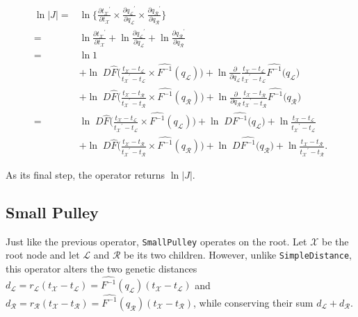 \documentclass[12pt]{article}
\begin{document}
\begin{align}
	\ln |J| =&  \ln \{ \frac{\partial {t_\mathcal{X}}^\prime}{\partial t_\mathcal{X}} \times \frac{\partial {q_\mathcal{L}}^\prime}{\partial q_\mathcal{L}} \times \frac{\partial {q_\mathcal{R}}^\prime}{\partial q_\mathcal{R}} \} \nonumber \\
			=& \ln \frac{\partial {t_\mathcal{X}}^\prime}{\partial t_\mathcal{X}} +  \ln \frac{\partial {q_\mathcal{L}}^\prime}{\partial q_\mathcal{L}} + \ln \frac{\partial {q_\mathcal{R}}^\prime}{\partial q_\mathcal{R}} \nonumber \\
			=& \ln 1  \nonumber\\
			&+ \ln \; D \hat{F}\Big( \frac{t_\mathcal{X} - t_\mathcal{L}}{{t_\mathcal{X}}^\prime - t_\mathcal{L}} \times \hat{F^{-1}}(q_\mathcal{L}) \Big) + \ln \frac{\partial}{\partial q_\mathcal{L}} \frac{t_\mathcal{X} - t_\mathcal{L}}{{t_\mathcal{X}}^\prime - t_\mathcal{L}} \hat{F^{-1}} \Big( q_\mathcal{L} \Big) \nonumber\\
			&+ \ln \; D \hat{F}\Big( \frac{t_\mathcal{X} - t_\mathcal{R}}{{t_\mathcal{X}}^\prime - t_\mathcal{R}}\times \hat{F^{-1}}(q_\mathcal{R}) \Big) + \ln \frac{\partial}{\partial q_\mathcal{R}} \frac{t_\mathcal{X} - t_\mathcal{R}}{{t_\mathcal{X}}^\prime - t_\mathcal{R}} \hat{F^{-1}} \Big( q_\mathcal{R} \Big) \nonumber\\
			=& \ln \; D \hat{F}\Big( \frac{t_\mathcal{X} - t_\mathcal{L}}{{t_\mathcal{X}}^\prime - t_\mathcal{L}} \times \hat{F^{-1}}(q_\mathcal{L}) \Big) + \ln \; D \hat{F^{-1}} \Big( q_\mathcal{L} \Big) + \ln \frac{t_\mathcal{X} - t_\mathcal{L}}{{t_\mathcal{X}}^\prime - t_\mathcal{L}}\nonumber \\
			&+ \ln \; D \hat{F}\Big( \frac{t_\mathcal{X} - t_\mathcal{R}}{{t_\mathcal{X}}^\prime - t_\mathcal{R}}\times \hat{F^{-1}}(q_\mathcal{R}) \Big) + \ln \; D \hat{F^{-1}} \Big( q_\mathcal{R} \Big) + \ln  \frac{t_\mathcal{X} - t_\mathcal{R}}{{t_\mathcal{X}}^\prime - t_\mathcal{R}}.
\end{align}


As its final step, the operator returns $\ln |J|$. 


\subsection*{Small Pulley}

Just like the previous operator, \texttt{SmallPulley} operates on the root. 
Let $\mathcal{X}$ be the root node and let $\mathcal{L}$ and $\mathcal{R}$ be its two children.
However, unlike \texttt{SimpleDistance}, this operator alters the two genetic distances $d_\mathcal{L} = r_\mathcal{L} (t_\mathcal{X} - t_\mathcal{L}) = \hat{F^{-1}} (q_\mathcal{L}) (t_\mathcal{X} - t_\mathcal{L})$ and $d_\mathcal{R} = r_\mathcal{R} (t_\mathcal{X} - t_\mathcal{R}) = \hat{F^{-1}} (q_\mathcal{R}) (t_\mathcal{X} - t_\mathcal{R})$, while conserving their sum $d_\mathcal{L} + d_\mathcal{R}$.
\end{document}
